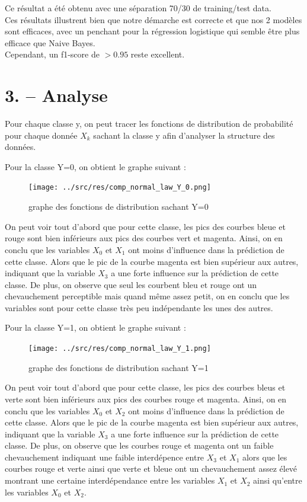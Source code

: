 \documentclass[
]{article}
\begin{document}
Ce résultat a été obtenu avec une séparation 70/30 de training/test
data.\\
Ces résultats illustrent bien que notre démarche est correcte et que nos
2 modèles sont efficaces, avec un penchant pour la régression logistique
qui semble être plus efficace que Naive Bayes.\\
Cependant, un f1-score de \(> 0.95\) reste excellent.

\newpage{}

\hypertarget{analyse}{%
\section{3. -- Analyse}\label{analyse}}

Pour chaque classe y, on peut tracer les fonctions de distribution de
probabilité pour chaque donnée \(X_k\) sachant la classe y afin
d'analyser la structure des données.

Pour la classe Y=0, on obtient le graphe suivant :

\begin{figure}
\centering
\texttt{[image: ../src/res/comp\_normal\_law\_Y\_0.png]}
\caption{graphe des fonctions de distribution sachant Y=0}
\end{figure}

On peut voir tout d'abord que pour cette classe, les pics des courbes
bleue et rouge sont bien inférieurs aux pics des courbes vert et
magenta. Ainsi, on en conclu que les variables \(X_0\) et \(X_1\) ont
moins d'influence dans la prédiction de cette classe. Alors que le pic
de la courbe magenta est bien supérieur aux autres, indiquant que la
variable \(X_3\) a une forte influence sur la prédiction de cette
classe. De plus, on observe que seul les courbent bleu et rouge ont un
chevauchement perceptible mais quand même assez petit, on en conclu que
les variables sont pour cette classe très peu indépendante les unes des
autres.

\newpage{}

Pour la classe Y=1, on obtient le graphe suivant :

\begin{figure}
\centering
\texttt{[image: ../src/res/comp\_normal\_law\_Y\_1.png]}
\caption{graphe des fonctions de distribution sachant Y=1}
\end{figure}

On peut voir tout d'abord que pour cette classe, les pics des courbes
bleus et verte sont bien inférieurs aux pics des courbes rouge et
magenta. Ainsi, on en conclu que les variables \(X_0\) et \(X_2\) ont
moins d'influence dans la prédiction de cette classe. Alors que le pic
de la courbe magenta est bien supérieur aux autres, indiquant que la
variable \(X_3\) a une forte influence sur la prédiction de cette
classe. De plus, on observe que les courbes rouge et magenta ont un
faible chevauchement indiquant une faible interdépence entre \(X_3\) et
\(X_1\) alors que les courbes rouge et verte ainsi que verte et bleue
ont un chevauchement assez élevé montrant une certaine interdépendance
entre les variables \(X_1\) et \(X_2\) ainsi qu'entre les variables
\(X_0\) et \(X_2\).
\end{document}
